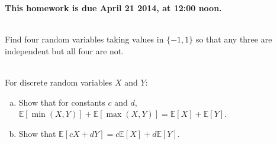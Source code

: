 \documentclass[]{article}
\newif\ifsolutions
\renewcommand{\answer}[1]{{\color{mydarkblue}\textbf{Solution:}#1}}
\begin{document}
\maketitle
{}
\vspace{0.5em}
{\Large{\textbf{This homework is due April 21 2014, at 12:00 noon.}}}

\begin{qunlist}

\\
Find four random variables taking values in $\{-1,1\}$ so that any three are independent but all four are not.

\ifsolutions{ \answer{
Let $X_1,X_2,X_3,X_4$ be i.i.d random variables with $P(X_i=1)=P(X_i=-1)=1/2$. Let $X_4=X_1X_2X_3$. Check that $X_1,X_2,X_3,X_4$ are four random variables such that any three are independent but all four are not. For example, they are not all independent because
\[
P(X_1=1,X_2=1,X_3=1,X_4=1)=1/8 \neq
P(X_1=1)P(X_2=1)P(X_3=1)P(X_4=1)
\]
}}
\fi

 \\ For discrete random variables $X$ and $Y$:

\begin{enumerate}[a)]
\qpart
\item Show that for constants $c$ and $d$, $\mathbb{E}[\min(X,Y)] + \mathbb{E}[\max(X,Y)] = \mathbb{E}[X] + \mathbb{E}[Y]$.




\qpart
\item Show that $\mathbb{E}[cX + dY] = c\mathbb{E}[X] + d \mathbb{E}[Y]$.

\ifsolutions{ \answer{ Beginning with the LHS:
		\begin{align*}
		\mathbb{E}[cX + dY] & = \sum_{x,y} (cx+dy) \mathbb{P}(x,y) \\
		& = c\sum_{x,y} x \mathbb{P}(x,y) + d\sum_{x,y} y \mathbb{P}(x,y) \\
		& = c \sum_x x \sum_y \mathbb{P}(x,y) + d \sum_y y \sum_x \mathbb{P}(x,y) \\
		& = c\sum_x x \mathbb{P}(x) + d\sum_y y \mathbb{P}(y) \\
		& = c\mathbb{E}[X] + d \mathbb{E}[Y].
		\end{align*}
}}
\fi


\end{enumerate}
\end{qunlist}
\end{document}

